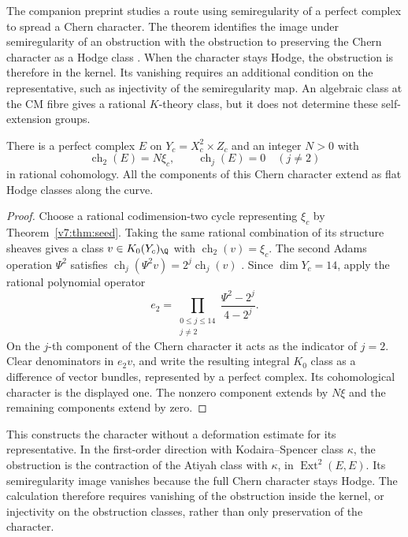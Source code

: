 The companion preprint \cite{BBsecant26} studies a route using semiregularity of a perfect complex to spread a Chern character. The theorem identifies the image under semiregularity of an obstruction with the obstruction to preserving the Chern character as a Hodge class \cite{Pri24}. When the character stays Hodge, the obstruction is therefore in the kernel. Its vanishing requires an additional condition on the representative, such as injectivity of the semiregularity map. An algebraic class at the CM fibre gives a rational \(K\)-theory class, but it does not determine these self-extension groups.

\begin{proposition}\label{v7:prop:adams}
There is a perfect complex \(E\) on \(Y_c=X_c^2\times Z_c\) and an integer \(N>0\) with
\[
 \operatorname{ch}_2(E)=N\xi_c,\qquad
 \operatorname{ch}_j(E)=0\quad(j\ne2)
\]
in rational cohomology. All the components of this Chern character extend as flat Hodge classes along the curve.
\end{proposition}
\begin{proof}
Choose a rational codimension-two cycle representing \(\xi_c\) by Theorem~\ref{v7:thm:seed}. Taking the same rational combination of its structure sheaves gives a class \(v\in K_0(Y_c)_\Q\) with \(\operatorname{ch}_2(v)=\xi_c\). The second Adams operation \(\Psi^2\) satisfies \(\operatorname{ch}_j(\Psi^2v)=2^j\operatorname{ch}_j(v)\) \cite{Ful98}. Since \(\dim Y_c=14\), apply the rational polynomial operator
\[
 e_2=\prod_{\substack{0\le j\le14\\j\ne2}}
              \frac{\Psi^2-2^j}{4-2^j}.
\]
On the \(j\)-th component of the Chern character it acts as the indicator of \(j=2\). Clear denominators in \(e_2v\), and write the resulting integral \(K_0\) class as a difference of vector bundles, represented by a perfect complex. Its cohomological character is the displayed one. The nonzero component extends by \(N\xi\) and the remaining components extend by zero.
\end{proof}

This constructs the character without a deformation estimate for its representative. In the first-order direction with Kodaira--Spencer class \(\kappa\), the obstruction is the contraction of the Atiyah class with \(\kappa\), in \(\operatorname{Ext}^2(E,E)\). Its semiregularity image vanishes because the full Chern character stays Hodge. The calculation therefore requires vanishing of the obstruction inside the kernel, or injectivity on the obstruction classes, rather than only preservation of the character.


